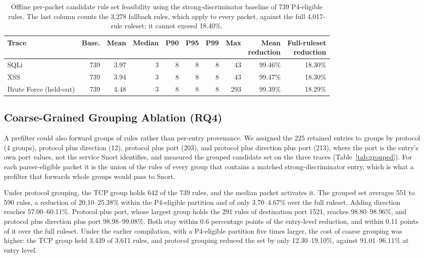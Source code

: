 \documentclass{article}
\begin{document}
\begin{table}[t]
\centering
\footnotesize
\setlength{\tabcolsep}{2pt}
\caption{Offline per-packet candidate rule set feasibility using the
strong-discriminator baseline of 739 P4-eligible rules. The last column
counts the 3,278 fallback rules, which apply to every packet, against the
full 4,017-rule ruleset; it cannot exceed 18.40\%.}
\label{tab:candidate-rules}
\begin{tabular}{lrrrrrrrrr}
\toprule
Trace & Base. & Mean & Median & P90 & P95 & P99 & Max & \shortstack{Mean\\reduction} & \shortstack{Full-ruleset\\reduction} \\
\midrule
SQLi & 739 & 3.97 & 3 & 8 & 8 & 8 & 43 & 99.46\% & 18.30\% \\
XSS & 739 & 3.94 & 3 & 8 & 8 & 8 & 43 & 99.47\% & 18.30\% \\
Brute Force (held-out) & 739 & 4.48 & 3 & 8 & 8 & 8 & 293 & 99.39\% & 18.29\% \\
\bottomrule
\end{tabular}
\end{table}

\subsection{Coarse-Grained Grouping Ablation (RQ4)}
A prefilter could also forward groups of rules rather than per-entry
provenance. We assigned the 225 retained entries to groups by protocol
(4 groups), protocol plus direction (12), protocol plus port (203), and
protocol plus direction plus port (213), where the port is the entry's own
port values, not the service Snort identifies, and measured the grouped
candidate set on the three traces (Table~\ref{tab:grouped}). For each
parser-eligible packet it is the union of the rules of every group that
contains a matched strong-discriminator entry, which is what a prefilter
that forwards whole groups would pass to Snort.

Under protocol grouping, the TCP group holds 642 of the 739 rules, and the
median packet activates it. The grouped set averages 551 to 590 rules, a
reduction of 20.10--25.38\% within the P4-eligible partition and of only
3.70--4.67\% over the full ruleset. Adding direction reaches
57.00--60.11\%. Protocol plus port, whose largest group holds the 291
rules of destination port 1521, reaches 98.80--98.96\%, and protocol plus
direction plus port 98.98--99.08\%. Both stay within 0.6 percentage
points of the entry-level reduction, and within 0.11 points of it over the
full ruleset. Under the earlier compilation, with a P4-eligible partition five times
larger, the cost of coarse grouping was higher: the TCP group held 3,439 of
3,611 rules, and protocol grouping reduced the set by only 12.30--19.10\%,
against 91.01--96.11\% at entry level.
\end{document}
